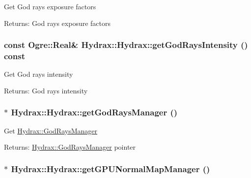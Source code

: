 Get God rays exposure factors \begin{Desc}
\item[Returns:]God rays exposure factors \end{Desc}
\hypertarget{class_hydrax_1_1_hydrax_7e9e195b0df7b42440d6a93914527186}{
\subsubsection[{getGodRaysIntensity}]{\setlength{\rightskip}{0pt plus 5cm}const Ogre::Real\& Hydrax::Hydrax::getGodRaysIntensity () const}}
\label{class_hydrax_1_1_hydrax_7e9e195b0df7b42440d6a93914527186}


Get God rays intensity \begin{Desc}
\item[Returns:]God rays intensity \end{Desc}
\hypertarget{class_hydrax_1_1_hydrax_50fd9a0cdeb608f8048713dffffe9c55}{
\subsubsection[{getGodRaysManager}]{$\ast$ Hydrax::Hydrax::getGodRaysManager ()}}
\label{class_hydrax_1_1_hydrax_50fd9a0cdeb608f8048713dffffe9c55}


Get \hyperlink{class_hydrax_1_1_god_rays_manager}{Hydrax::GodRaysManager} \begin{Desc}
\item[Returns:]\hyperlink{class_hydrax_1_1_god_rays_manager}{Hydrax::GodRaysManager} pointer \end{Desc}
\hypertarget{class_hydrax_1_1_hydrax_38e4600d83e382515265b70e0dcde4d2}{
\subsubsection[{getGPUNormalMapManager}]{$\ast$ Hydrax::Hydrax::getGPUNormalMapManager ()}}
\label{class_hydrax_1_1_hydrax_38e4600d83e382515265b70e0dcde4d2}


